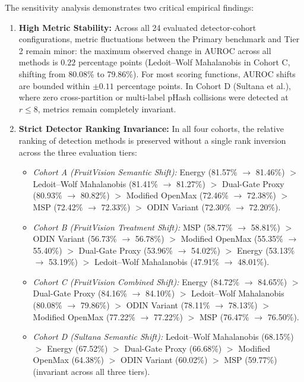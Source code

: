 The sensitivity analysis demonstrates two critical empirical findings:
\begin{enumerate}
\setlength{\itemsep}{0pt}
\setlength{\parsep}{0pt}
\setlength{\parskip}{0pt}
\setlength{\topsep}{1pt}
\setlength{\partopsep}{0pt}
\item \textbf{High Metric Stability:} Across all 24 evaluated detector-cohort configurations, metric fluctuations between the Primary benchmark and Tier 2 remain minor: the maximum observed change in AUROC across all methods is $0.22$ percentage points (Ledoit--Wolf Mahalanobis in Cohort C, shifting from 80.08\% to 79.86\%). For most scoring functions, AUROC shifts are bounded within $\pm 0.11$ percentage points. In Cohort D (Sultana et al.), where zero cross-partition or multi-label pHash collisions were detected at $r \le 8$, metrics remain completely invariant.
\item \textbf{Strict Detector Ranking Invariance:} In all four cohorts, the relative ranking of detection methods is preserved without a single rank inversion across the three evaluation tiers:
\begin{itemize}
\item \textit{Cohort A (FruitVision Semantic Shift):} Energy (81.57\% $\to$ 81.46\%) $>$ Ledoit--Wolf Mahalanobis (81.41\% $\to$ 81.27\%) $>$ Dual-Gate Proxy (80.93\% $\to$ 80.82\%) $>$ Modified OpenMax (72.46\% $\to$ 72.38\%) $>$ MSP (72.42\% $\to$ 72.33\%) $>$ ODIN Variant (72.30\% $\to$ 72.20\%).
\item \textit{Cohort B (FruitVision Treatment Shift):} MSP (58.77\% $\to$ 58.81\%) $>$ ODIN Variant (56.73\% $\to$ 56.78\%) $>$ Modified OpenMax (55.35\% $\to$ 55.40\%) $>$ Dual-Gate Proxy (53.96\% $\to$ 54.02\%) $>$ Energy (53.13\% $\to$ 53.19\%) $>$ Ledoit--Wolf Mahalanobis (47.91\% $\to$ 48.01\%).
\item \textit{Cohort C (FruitVision Combined Shift):} Energy (84.72\% $\to$ 84.65\%) $>$ Dual-Gate Proxy (84.16\% $\to$ 84.10\%) $>$ Ledoit--Wolf Mahalanobis (80.08\% $\to$ 79.86\%) $>$ ODIN Variant (78.11\% $\to$ 78.13\%) $>$ Modified OpenMax (77.22\% $\to$ 77.22\%) $>$ MSP (76.47\% $\to$ 76.50\%).
\item \textit{Cohort D (Sultana Semantic Shift):} Ledoit--Wolf Mahalanobis (68.15\%) $>$ Energy (67.52\%) $>$ Dual-Gate Proxy (66.68\%) $>$ Modified OpenMax (64.38\%) $>$ ODIN Variant (60.02\%) $>$ MSP (59.77\%) (invariant across all three tiers).
\end{itemize}
\end{enumerate}

